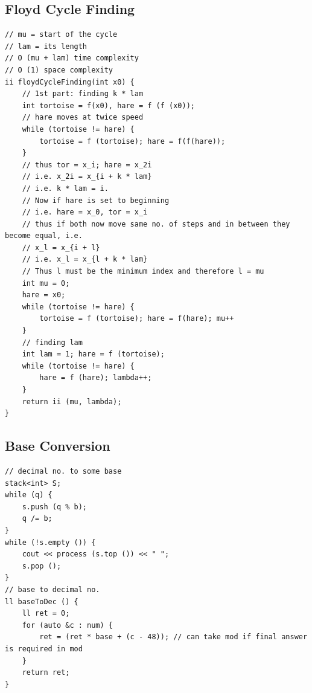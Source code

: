 \documentclass[8pt, a4paper, oneside, twocolumn]{extarticle}
\begin{document}
\subsection{Floyd Cycle Finding}
\begin{verbatim}
// mu = start of the cycle
// lam = its length
// O (mu + lam) time complexity
// O (1) space complexity
ii floydCycleFinding(int x0) {
    // 1st part: finding k * lam
    int tortoise = f(x0), hare = f (f (x0));
    // hare moves at twice speed
    while (tortoise != hare) {
        tortoise = f (tortoise); hare = f(f(hare));
    }
    // thus tor = x_i; hare = x_2i
    // i.e. x_2i = x_{i + k * lam}
    // i.e. k * lam = i.
    // Now if hare is set to beginning
    // i.e. hare = x_0, tor = x_i
    // thus if both now move same no. of steps and in between they become equal, i.e.
    // x_l = x_{i + l}
    // i.e. x_l = x_{l + k * lam}
    // Thus l must be the minimum index and therefore l = mu
    int mu = 0;
    hare = x0;
    while (tortoise != hare) {
        tortoise = f (tortoise); hare = f(hare); mu++
    }
    // finding lam
    int lam = 1; hare = f (tortoise);
    while (tortoise != hare) {
        hare = f (hare); lambda++;
    }
    return ii (mu, lambda);
}
\end{verbatim}
\subsection{Base Conversion}
\begin{verbatim}
// decimal no. to some base
stack<int> S;
while (q) {
    s.push (q % b);
    q /= b;
}
while (!s.empty ()) {
    cout << process (s.top ()) << " ";
    s.pop ();
}
// base to decimal no.
ll baseToDec () {
    ll ret = 0;
    for (auto &c : num) {
        ret = (ret * base + (c - 48)); // can take mod if final answer is required in mod
    }
    return ret;
}
\end{verbatim}
\end{document}
